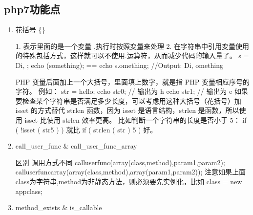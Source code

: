 \documentclass[a4paper,10pt,english]{sphinxmanual}
\begin{document}
\subsection{php7功能点}
\label{\detokenize{program/php:php7}}\begin{enumerate}
\item {} 
花括号 \{\}

\begin{sphinxVerbatim}[commandchars=\\\{\}]
1. 表示\PYGZob{}\PYGZcb{}里面的是一个变量  ,执行时按照变量来处理
2. 在字符串中引用变量使用的特殊包括方式，这样就可以不使用.运算符，从而减少代码的输入量了。
\PYGZdl{}s = \PYGZdq{}Di, \PYGZdq{};
echo (\PYGZdq{}\PYGZdl{}\PYGZob{}s\PYGZcb{}omething\PYGZdq{});  == echo \PYGZdl{}s.\PYGZdq{}omething\PYGZdq{};
//Output: Di, omething

PHP 变量后面加上一个大括号\PYGZob{}\PYGZcb{}，里面填上数字，就是指 PHP 变量相应序号的字符。
例如：
\PYGZdl{}str = \PYGZsq{}hello\PYGZsq{};
echo \PYGZdl{}str\PYGZob{}0\PYGZcb{}; // 输出为 h
echo \PYGZdl{}str\PYGZob{}1\PYGZcb{}; // 输出为 e
如果要检查某个字符串是否满足多少长度，可以考虑用这种大括号（花括号）加 isset 的方式替代 strlen 函数，因为 isset 是语言结构，strlen 是函数，所以使用 isset 比使用 strlen 效率更高。
比如判断一个字符串的长度是否小于 5：
if ( !isset ( \PYGZdl{}str\PYGZob{}5\PYGZcb{} ) ) 就比 if ( strlen ( \PYGZdl{}str ) \PYGZlt{} 5 ) 好。
\end{sphinxVerbatim}

\item {} 
call\_user\_func \& call\_user\_func\_array

\begin{sphinxVerbatim}[commandchars=\\\{\}]
区别 调用方式不同
    call\PYGZus{}user\PYGZus{}func(array(\PYGZdl{}class,\PYGZdl{}method),param1,param2);
    call\PYGZus{}user\PYGZus{}func\PYGZus{}array(array(\PYGZdl{}class,\PYGZdl{}method),array(param1,param2));
注意如果上面\PYGZdl{}class为字符串,\PYGZdl{}method为非静态方法，则必须要先实例化，比如 \PYGZdl{}class = new \PYGZbs{}app\PYGZbs{}class;
\end{sphinxVerbatim}

\item {} 
method\_exists \& is\_callable


\end{enumerate}
\end{document}
